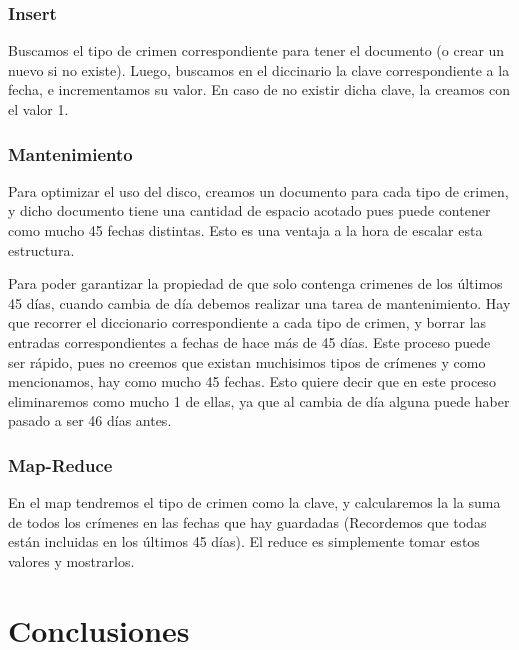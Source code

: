 \documentclass[11pt, a4paper]{article}
\begin{document}
\subsubsection{Insert}
Buscamos el tipo de crimen correspondiente para tener el documento (o crear un nuevo si no existe). Luego, buscamos en el diccinario la clave correspondiente a la fecha, e incrementamos su valor. En caso de no existir dicha clave, la creamos con el valor 1.

\subsubsection{Mantenimiento}

Para optimizar el uso del disco, creamos un documento para cada tipo de crimen, y dicho documento tiene una cantidad de espacio acotado pues puede contener como mucho 45 fechas distintas. Esto es una ventaja a la hora de escalar esta estructura.\

Para poder garantizar la propiedad de que solo contenga crimenes de los \'ultimos 45 d\'ias, cuando cambia de d\'ia debemos realizar una tarea de mantenimiento. Hay que recorrer el diccionario correspondiente a cada tipo de crimen, y borrar las entradas correspondientes a fechas de hace más de 45 días. Este proceso puede ser r\'apido, pues no creemos que existan muchisimos tipos de cr\'imenes y como mencionamos, hay como mucho 45 fechas. Esto quiere decir que en este proceso eliminaremos como mucho 1 de ellas, ya que al cambia de d\'ia alguna puede haber pasado a ser 46 d\'ias antes.

\subsubsection{Map-Reduce}

En el map tendremos el tipo de crimen como la clave, y calcularemos la la suma de todos los crímenes en las fechas que hay guardadas (Recordemos que todas están incluidas en los últimos 45 días). El reduce es simplemente tomar estos valores y mostrarlos. \

\section{Conclusiones}
\end{document}
